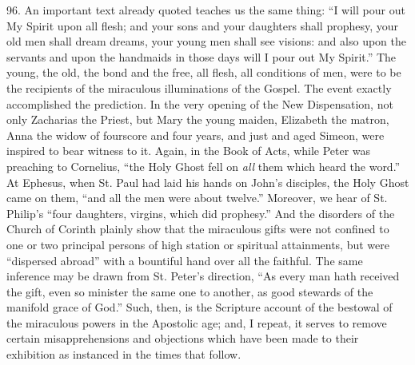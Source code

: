 96.
An important text already quoted teaches us the same thing: ``I will
pour out My Spirit upon all flesh; and your sons and your daughters
shall prophesy, your old men shall dream dreams, your young men shall
see visions: and also upon the servants and upon the handmaids in
those days will I pour out My Spirit.'' The young, the old, the bond
and the free, all flesh, all conditions of men, were to be the
recipients of the miraculous illuminations of the Gospel. The event
exactly accomplished the prediction. In the very opening of the New
Dispensation, not only Zacharias the Priest, but Mary the young maiden, Elizabeth the matron, Anna the widow of fourscore and four
years, and just and aged Simeon, were inspired to bear witness to it.
Again, in the Book of Acts, while Peter was preaching to Cornelius, ``the
Holy Ghost fell on \emph{all} them which heard the word.'' At Ephesus,
when St. Paul had laid his hands on John's disciples, the Holy Ghost
came on them, ``and all the men were about twelve.'' Moreover, we hear
of St. Philip's ``four daughters, virgins, which did prophesy.'' And the
disorders of the Church of Corinth plainly show that the miraculous
gifts were not confined to one or two principal persons of high
station or spiritual attainments, but were ``dispersed abroad'' with a
bountiful hand over all the faithful. The same inference may be drawn
from St. Peter's direction, ``As every man hath received the gift, even
so minister the same one to another, as good stewards of the manifold
grace of God.'' Such, then, is the Scripture account of the bestowal of
the miraculous powers in the Apostolic age; and, I repeat, it serves
to remove certain misapprehensions and objections which have been made
to their exhibition as instanced in the times that follow.

